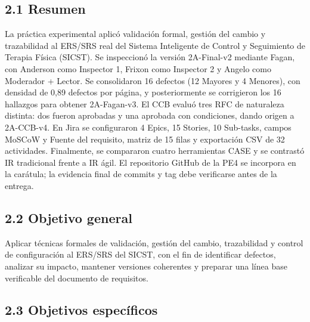 \documentclass[12pt]{article}
\begin{document}
\subsection{\texorpdfstring{2.1 Resumen}{2.1 Resumen}}\label{resumen}

La práctica experimental aplicó validación formal, gestión del cambio y trazabilidad al ERS/SRS real del Sistema Inteligente de Control y Seguimiento de Terapia Física (SICST). Se inspeccionó la versión 2A-Final-v2 mediante Fagan, con Anderson como Inspector 1, Frixon como Inspector 2 y Angelo como Moderador + Lector. Se consolidaron 16 defectos (12 Mayores y 4 Menores), con densidad de 0,89 defectos por página, y posteriormente se corrigieron los 16 hallazgos para obtener 2A-Fagan-v3. El CCB evaluó tres RFC de naturaleza distinta: dos fueron aprobadas y una aprobada con condiciones, dando origen a 2A-CCB-v4. En Jira se configuraron 4 Epics, 15 Stories, 10 Sub-tasks, campos MoSCoW y Fuente del requisito, matriz de 15 filas y exportación CSV de 32 actividades. Finalmente, se compararon cuatro herramientas CASE y se contrastó IR tradicional frente a IR ágil. El repositorio GitHub de la PE4 se incorpora en la carátula; la evidencia final de commits y tag debe verificarse antes de la entrega.

\subsection{\texorpdfstring{2.2 Objetivo general}{2.2 Objetivo general}}\label{objetivo-general}

Aplicar técnicas formales de validación, gestión del cambio, trazabilidad y control de configuración al ERS/SRS del SICST, con el fin de identificar defectos, analizar su impacto, mantener versiones coherentes y preparar una línea base verificable del documento de requisitos.

\subsection{\texorpdfstring{2.3 Objetivos específicos}{2.3 Objetivos específicos}}\label{objetivos-especuxedficos}
\end{document}
